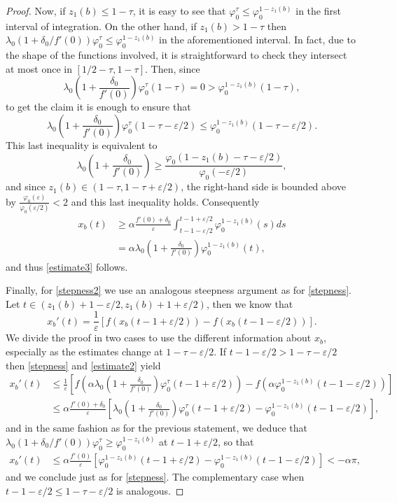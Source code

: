 \documentclass[a4paper,11pt]{article}
\theoremstyle{plain}
\theoremstyle{definition}
\theoremstyle{definition}
\numberwithin{equation}{section}
\begin{document}
\begin{proof}
Now, if $z_1(b)\leq 1-\tau$, it is easy to see that $\varphi_0^{\tau} \leq \varphi_0^{1-z_1(b)}$ in the first interval of integration. On the other hand, if $z_1(b)>1-\tau$ then $\lambda_0(1+\delta_0/f'(0))\varphi_0^\tau \leq \varphi_0^{1-z_1(b)}$ in the aforementioned interval. In fact, due to the shape of the functions involved, it is straightforward to check they intersect at most once in $[1/2-\tau, 1-\tau]$. Then, since
\[
    \lambda_0\left( 1+\frac{\delta_0}{f'(0)} \right) \varphi_0^\tau(1-\tau) = 0 >\varphi_0^{1-z_1(b)}(1-\tau),
\]
to get the claim it is enough to ensure that
\[
    \lambda_0\left( 1+\frac{\delta_0}{f'(0)} \right)\varphi_0^{\tau}(1-\tau-\varepsilon/2)\leq \varphi_0^{1-z_1(b)}(1-\tau-\varepsilon/2).
\]
This last inequality is equivalent to
\[
    \lambda_0\left( 1+\frac{\delta_0}{f'(0)} \right) \geq \frac{\varphi_0(1-z_1(b)-\tau-\varepsilon/2)}{\varphi_0(-\varepsilon/2)},
\]
and since $z_1(b)\in(1-\tau,1-\tau+\varepsilon/2)$, the right-hand side is bounded above by $\frac{\varphi_0(\varepsilon)}{\varphi_0(\varepsilon/2)}< 2$ and this last inequality holds. Consequently
\begin{align*}
    x_b(t) &\geq \alpha\frac{f'(0)+\delta_0}{\varepsilon} \int_{t-1-\varepsilon/2}^{t-1+\varepsilon/2} \varphi_0^{1-z_1(b)}(s) ds \\
    & = \alpha\lambda_0\left( 1+\frac{\delta_0}{f'(0)} \right) \varphi_0^{1-z_1(b)}(t),
\end{align*}
and thus \eqref{estimate3} follows.

Finally, for \eqref{stepness2} we use an analogous steepness argument as for \eqref{stepness}. Let $t\in (z_1(b)+1-\varepsilon/2, z_1(b)+1+\varepsilon/2)$, then we know that
\[
    x_b'(t) = \frac{1}{\varepsilon} [ f(x_b(t-1+\varepsilon/2)) - f(x_b(t-1-\varepsilon/2)) ].
\]
We divide the proof in two cases to use the different information about $x_b$, especially as the estimates change at $1-\tau-\varepsilon/2$. If $t-1-\varepsilon/2>1-\tau-\varepsilon/2$ then \eqref{stepness} and \eqref{estimate2} yield
\begin{align*}
    x_b'(t)& \leq \frac{1}{\varepsilon} \left[ f\left( \alpha\lambda_0\left( 1+\frac{\delta_0}{f'(0)} \right) \varphi_0^\tau(t-1+\varepsilon/2) \right) - f(\alpha\varphi_0^{1-z_1(b)}(t-1-\varepsilon/2)) \right] \\
    & \leq \alpha\frac{f'(0)+\delta_0}{\varepsilon} \left[ \lambda_0\left( 1+\frac{\delta_0}{f'(0)} \right) \varphi_0^\tau(t-1+\varepsilon/2) - \varphi_0^{1-z_1(b)}(t-1-\varepsilon/2) \right],
\end{align*}
and in the same fashion as for the previous statement, we deduce that $\lambda_0(1+\delta_0/f'(0))\varphi_0^\tau \geq \varphi_0^{1-z_1(b)}$ at $t-1+\varepsilon/2$, so that
\begin{align*}
    x_b'(t) &\leq \alpha\frac{f'(0)}{\varepsilon}[\varphi_0^{1-z_1(b)}(t-1+\varepsilon/2) - \varphi_0^{1-z_1(b)}(t-1-\varepsilon/2)] <-\alpha\pi,
\end{align*}
and we conclude just as for \eqref{stepness}. The complementary case when $t-1-\varepsilon/2\leq 1-\tau-\varepsilon/2$ is analogous.
\end{proof}
\end{document}
